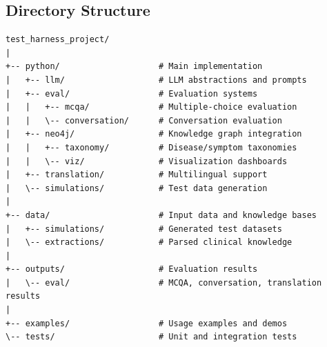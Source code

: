 
\subsection{Directory Structure}
\begin{verbatim}
test_harness_project/
|
+-- python/                    # Main implementation
|   +-- llm/                   # LLM abstractions and prompts
|   +-- eval/                  # Evaluation systems
|   |   +-- mcqa/              # Multiple-choice evaluation
|   |   \-- conversation/      # Conversation evaluation
|   +-- neo4j/                 # Knowledge graph integration
|   |   +-- taxonomy/          # Disease/symptom taxonomies
|   |   \-- viz/               # Visualization dashboards
|   +-- translation/           # Multilingual support
|   \-- simulations/           # Test data generation
|
+-- data/                      # Input data and knowledge bases
|   +-- simulations/           # Generated test datasets
|   \-- extractions/           # Parsed clinical knowledge
|
+-- outputs/                   # Evaluation results
|   \-- eval/                  # MCQA, conversation, translation results
|
+-- examples/                  # Usage examples and demos
\-- tests/                     # Unit and integration tests
\end{verbatim}
